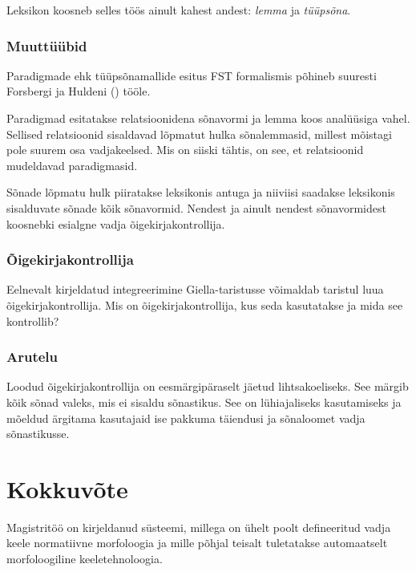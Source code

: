 \documentclass[12pt,a4paper]{article}
\begin{document}
Leksikon koosneb selles töös ainult kahest andest: \textit{lemma} ja \textit{tüüpsõna}. 

\subsubsection{Muuttüübid}
\label{sec:giella-muuttüübid}

Paradigmade ehk tüüpsõnamallide esitus FST formalismis põhineb suuresti Forsbergi ja Huldeni (\citeyear{forsberg_learning_2016}) tööle.

Paradigmad esitatakse relatsioonidena sõnavormi ja lemma koos analüüsiga vahel. Sellised relatsioonid sisaldavad lõpmatut hulka sõnalemmasid, millest mõistagi pole suurem osa vadjakeelsed. Mis on siiski tähtis, on see, et relatsioonid mudeldavad paradigmasid.

Sõnade lõpmatu hulk piiratakse leksikonis antuga ja niiviisi saadakse leksikonis sisalduvate sõnade kõik sõnavormid. Nendest ja ainult nendest sõnavormidest koosnebki esialgne vadja õigekirja\-kontrollija.

\subsubsection{Õigekirjakontrollija}
\label{sec:giella-õigekirjakontrollija}

Eelnevalt kirjeldatud integreerimine Giella-taristusse võimaldab taristul luua õigekirjakontrollija. Mis on õigekirjakontrollija, kus seda kasutatakse ja mida see kontrollib?

\subsubsection{Arutelu}
\label{sec:giella-arutelu}

Loodud õigekirjakontrollija on eesmärgipäraselt jäetud lihtsakoeliseks. See märgib kõik sõnad valeks, mis ei sisaldu sõnastikus. See on lühiajaliseks kasutamiseks ja mõeldud ärgitama kasutajaid ise pakkuma täiendusi ja sõnaloomet vadja sõnastikusse.






\newpage
\section{Kokkuvõte}

Magistritöö on kirjeldanud süsteemi, millega on ühelt poolt defineeritud vadja keele normatiivne morfoloogia ja mille põhjal teisalt tuletatakse automaatselt morfoloogiline keeletehnoloogia.
\end{document}
